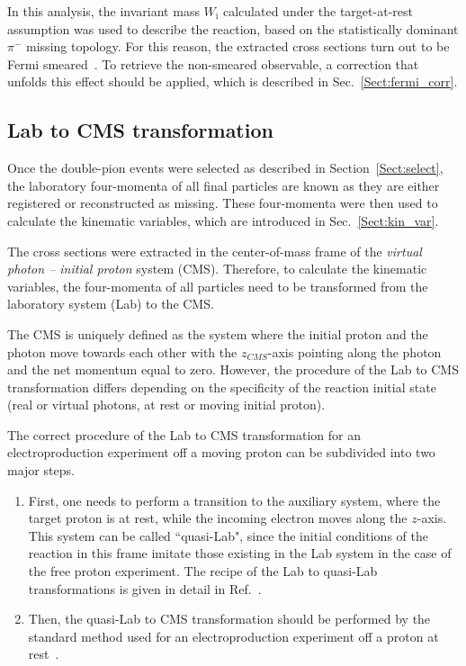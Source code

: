 \documentclass[prc,twocolumn,superscriptaddress,showpacs,amssymb,amsmath,amsfonts,aps,nofootinbib]{revtex4-1}
\begin{document}
In this analysis, the invariant mass $W_{\text{i}}$ calculated under the target-at-rest assumption was used to describe the reaction, based on the statistically dominant $\pi^{-}$ missing topology. For this reason, the extracted cross sections turn out to be Fermi smeared~\cite{Skorodumina:2015rea,twopeg-d}. To retrieve the non-smeared observable, a correction that unfolds this effect should be applied, which is described in Sec.\!~\ref{Sect:fermi_corr}.



\subsection{Lab to CMS transformation}
\label{Sect:lab_cms}

Once the double-pion events were selected as described in Section~\ref{Sect:select}, the laboratory four-momenta of all final particles are known as they are either registered or reconstructed as missing. These four-momenta were then used to calculate the kinematic variables, which are introduced in Sec.\!~\ref{Sect:kin_var}. 

The cross sections were extracted in the center-of-mass frame of the {\em virtual photon -- initial proton} system (CMS). Therefore, to calculate the kinematic variables, the four-momenta of all particles need to be transformed from the laboratory system (Lab) to the CMS.

The CMS is uniquely defined as the system where the initial proton and the photon move towards each other with the $z_{CMS}$-axis pointing along the photon and the net momentum equal to zero. However, the procedure of the Lab to CMS transformation differs depending on the specificity of the reaction initial state (real or virtual photons, at rest or moving initial proton).
 
The correct procedure of the Lab to CMS transformation for an electroproduction experiment off a moving proton can be subdivided into two major steps.

\begin{enumerate}
\item First, one needs to perform a transition to the auxiliary system, where the target proton is at rest, while the incoming electron moves along the $z$-axis. This system can be called ``quasi-Lab", since the initial conditions of the reaction in this frame imitate those existing in the Lab system in the case of the free proton experiment. The recipe of the Lab to quasi-Lab transformations is given in detail in Ref.\!~\cite{twopeg-d}.

\item Then, the quasi-Lab to CMS transformation should be performed by the standard method used for an electroproduction experiment off a proton at rest~\cite{Fed_an_note:2017,Fed_paper_2018,my_an_note:2020, my_thesis:2021}.
\end{enumerate}
\end{document}
